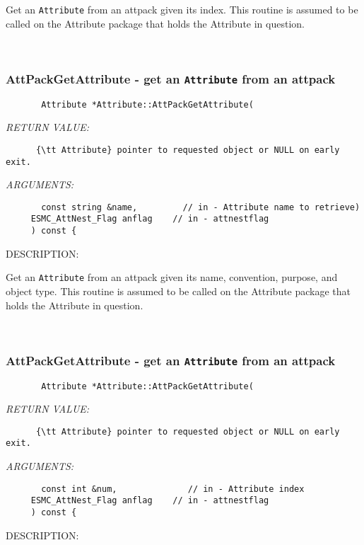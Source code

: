        Get an {\tt Attribute} from an attpack given its index.
       This routine is assumed to be called on the
       Attribute package that holds the Attribute in question.
   
 
\mbox{}\hrulefill\
 
\subsubsection [AttPackGetAttribute] {AttPackGetAttribute - get an {\tt Attribute} from an attpack}


  
\begin{verbatim}       Attribute *Attribute::AttPackGetAttribute(\end{verbatim}{\em RETURN VALUE:}
\begin{verbatim}      {\tt Attribute} pointer to requested object or NULL on early exit.\end{verbatim}{\em ARGUMENTS:}
\begin{verbatim}       const string &name,         // in - Attribute name to retrieve)
     ESMC_AttNest_Flag anflag    // in - attnestflag
     ) const {\end{verbatim}
{\sf DESCRIPTION:\\ }


       Get an {\tt Attribute} from an attpack given its name, convention,
       purpose, and object type.  This routine is assumed to be called on the
       Attribute package that holds the Attribute in question.
   
 
\mbox{}\hrulefill\
 
\subsubsection [AttPackGetAttribute] {AttPackGetAttribute - get an {\tt Attribute} from an attpack}


  
\begin{verbatim}       Attribute *Attribute::AttPackGetAttribute(\end{verbatim}{\em RETURN VALUE:}
\begin{verbatim}      {\tt Attribute} pointer to requested object or NULL on early exit.\end{verbatim}{\em ARGUMENTS:}
\begin{verbatim}       const int &num,              // in - Attribute index
     ESMC_AttNest_Flag anflag    // in - attnestflag
     ) const {\end{verbatim}
{\sf DESCRIPTION:\\ }


